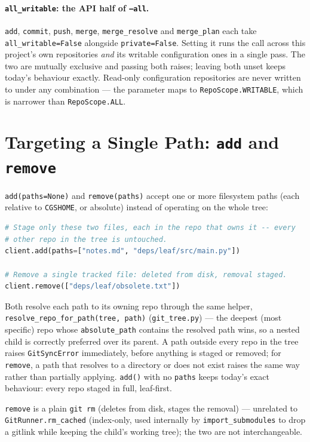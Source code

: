 \paragraph{\texttt{all\_writable}: the API half of \texttt{--all}.}
\texttt{add}, \texttt{commit}, \texttt{push}, \texttt{merge},
\texttt{merge\_resolve} and \texttt{merge\_plan} each take
\texttt{all\_writable=False} alongside \texttt{private=False}. Setting it
runs the call across this project's own repositories \emph{and} its
writable configuration ones in a single pass. The two are mutually
exclusive and passing both raises; leaving both unset keeps today's
behaviour exactly. Read-only configuration repositories are never written
to under any combination --- the parameter maps to
\texttt{RepoScope.WRITABLE}, which is narrower than
\texttt{RepoScope.ALL}.

\section{Targeting a Single Path: \texttt{add} and \texttt{remove}}

\texttt{add(paths=None)} and \texttt{remove(paths)} accept one or more
filesystem paths (each relative to \texttt{CGSHOME}, or absolute)
instead of operating on the whole tree:

\begin{lstlisting}[language=Python]
# Stage only these two files, each in the repo that owns it -- every
# other repo in the tree is untouched.
client.add(paths=["notes.md", "deps/leaf/src/main.py"])

# Remove a single tracked file: deleted from disk, removal staged.
client.remove(["deps/leaf/obsolete.txt"])
\end{lstlisting}

Both resolve each path to its owning repo through the same helper,
\texttt{resolve\_repo\_for\_path(tree, path)} (\texttt{git\_tree.py}) ---
the deepest (most specific) repo whose \texttt{absolute\_path} contains the
resolved path wins, so a nested child is correctly preferred over its
parent. A path outside every repo in the tree raises
\texttt{GitSyncError} immediately, before anything is staged or removed;
for \texttt{remove}, a path that resolves to a directory or does not exist
raises the same way rather than partially applying. \texttt{add()} with no
\texttt{paths} keeps today's exact behaviour: every repo staged in full,
leaf-first.

\texttt{remove} is a plain \texttt{git rm} (deletes from disk, stages the
removal) --- unrelated to \texttt{GitRunner.rm\_cached} (index-only, used
internally by \texttt{import\_submodules} to drop a gitlink while keeping
the child's working tree); the two are not interchangeable.

